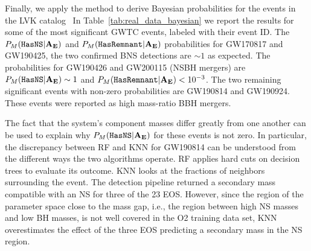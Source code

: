 Finally, we apply the method to derive Bayesian probabilities for the events in the \ac{LVK}  catalog~  In Table~\ref{tab:real_data_bayesian} we
report the results for some of the most significant \ac{GWTC} events, labeled with their event ID. The $P_M({{\tt HasNS}} |\bf{A_E})$ and $P_M({{\tt HasRemnant}} |\bf{A_E})$ probabilities for GW170817 and
GW190425, the two confirmed \ac{BNS} detections are $\sim 1$ as expected.  The probabilities for GW190426 and GW200115 (\ac{NSBH} mergers) are $P_M({{\tt HasNS}} |{\bf{A_E}}) \sim 1$ and
$P_M({{\tt HasRemnant}} |{\bf{A_E}}) < 10^{-3}$. The two remaining significant events with non-zero probabilities are GW190814 and GW190924. These events were reported as high mass-ratio BBH
mergers. 

The fact that the system's component masses differ greatly from one another can be used to explain why $P_M({{\tt HasNS}} |\bf{A_E})$ for these events is not zero. In particular, the discrepancy
between \ac{RF} and \ac{KNN} for GW190814 can be understood from the different ways the two algorithms operate. \ac{RF} applies hard cuts on decision trees to evaluate its outcome.
\ac{KNN} looks at the fractions of neighbors surrounding the event. The detection pipeline returned a secondary mass compatible with an \ac{NS} for three of the 23 \ac{EOS}. However,
since the region of the parameter space close to the mass gap, i.e., the region between high \ac{NS} masses and low \ac{BH} masses, is not well covered in the \ac{O2} training data set,
\ac{KNN} overestimates the effect of the three \ac{EOS} predicting a secondary mass in the \ac{NS} region. 

